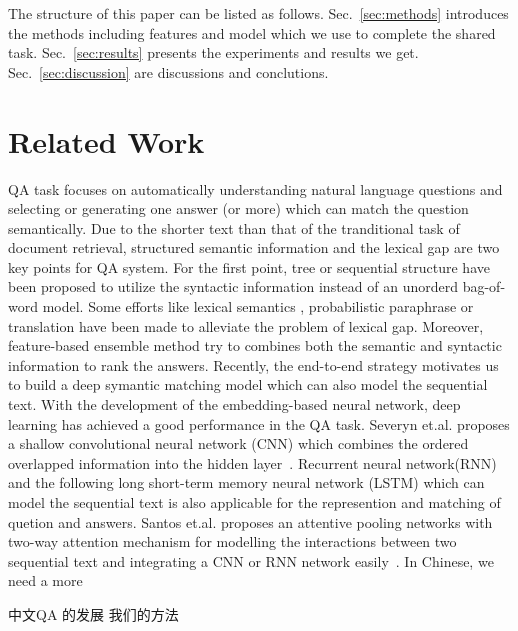 \documentclass{llncs}
\begin{document}
The structure of this paper can be listed as follows. Sec.~\ref{sec:methods} introduces the methods including features and model which we use to complete the shared task. Sec.~\ref{sec:results}  presents the experiments and results we get. Sec.~\ref{sec:discussion} are discussions and conclutions.

\section{Related Work}

QA task focuses on automatically {\color{red}understanding} natural language questions and {\color{red}selecting} or {\color{red}generating} one answer (or more) which can match  the question semantically. %
Due to the shorter text than {\color{red}that of} the tranditional task of document retrieval, structured semantic information and  the lexical gap are two key points for QA system. 
For the first point, tree \cite{Yao2013Answer} or sequential \cite{Wang2015FAQ} structure have been proposed to utilize the syntactic information instead of an  unorderd bag-of-word model.
Some efforts like lexical semantics \cite{Yih2013Question}, probabilistic paraphrase or translation \cite{Zhou2011Phrase} have been made to alleviate the problem of lexical gap.
Moreover, feature-based ensemble method \cite{Severyn2013Automatic} try to combines both the semantic and syntactic information to rank the answers. Recently, the end-to-end strategy motivates us to build a deep symantic matching model which can also model the sequential text. With the development of the embedding-based neural network, deep {\color{red}learning} \cite{Yu2014Deep} \cite{Feng2015Applying} has achieved a good performance in the QA task. Severyn et.al. proposes a shallow convolutional neural network (CNN) which combines the ordered overlapped information into the hidden layer~\cite{severyn2015learning}. Recurrent neural network(RNN) and the following long short-term memory neural network (LSTM) \cite{Wang2015A} \cite{Tan2015LSTM} which can model the sequential text is also applicable for the represention and matching of quetion and answers. Santos et.al. proposes an attentive pooling networks with two-way attention mechanism for modelling the interactions between two sequential text and  integrating a CNN or RNN network easily~\cite{Santos2016Attentive}.
In Chinese, we need a more 


中文QA 的发展
我们的方法
\end{document}
